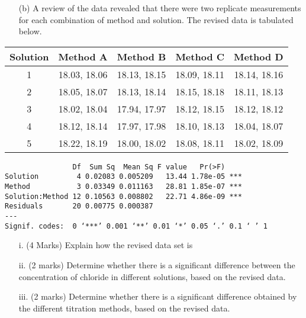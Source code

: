 \begin{itemize}
\item[(b)] A review of the data revealed that there were two replicate measurements for each combination of method and solution. The revised data is tabulated below.
\end{itemize}

    \begin{tabular}{|c|c|c|c|c|}
      \hline

      Solution &  Method A & Method B & Method C & Method D \\\hline
1&	18.03, 18.06	&	18.13, 18.15	&	18.09, 18.11	&	18.14, 18.16	\\
2&	18.05, 18.07	&	18.13, 18.14	&	18.15, 18.18	&	18.11, 18.13	\\
3&	18.02, 18.04	&	17.94, 17.97	&	18.12, 18.15	&	18.12, 18.12	\\
4&	18.12, 18.14	&	17.97, 17.98	&	18.10, 18.13	&	18.04, 18.07	\\
5&	18.22, 18.19	&	18.00, 18.02	&	18.08, 18.11	&	18.02, 18.09	\\
      \hline
    \end{tabular}

\begin{framed}
\begin{verbatim}
                Df  Sum Sq  Mean Sq F value   Pr(>F)
Solution         4 0.02083 0.005209   13.44 1.78e-05 ***
Method           3 0.03349 0.011163   28.81 1.85e-07 ***
Solution:Method 12 0.10563 0.008802   22.71 4.86e-09 ***
Residuals       20 0.00775 0.000387
---
Signif. codes:  0 ‘***’ 0.001 ‘**’ 0.01 ‘*’ 0.05 ‘.’ 0.1 ‘ ’ 1
\end{verbatim}
\end{framed}

\begin{itemize}
\item[i.] (4 Marks) Explain how the revised data set is
\item[ii.] (2 marks) Determine whether there is a significant difference between the concentration of chloride in different solutions, based on the revised data.
\item[iii.] (2 marks) Determine whether there is a  significant difference obtained by the different titration methods, based on the revised data.

\end{itemize}


